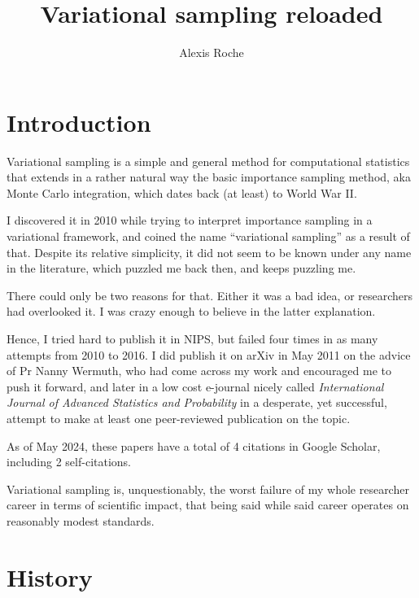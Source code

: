 \documentclass{article}
\title{Variational sampling reloaded}
\author{Alexis Roche}
\begin{document}
\maketitle


\section{Introduction}

Variational sampling is a simple and general method for computational statistics that extends in a rather natural way the basic importance sampling method, aka Monte Carlo integration, which dates back (at least) to World War II.

I discovered it in 2010 while trying to interpret importance sampling in a variational framework, and coined the name ``variational sampling'' as a result of that. Despite its relative simplicity, it did not seem to be known under any name in the literature, which puzzled me back then, and keeps puzzling me. 

There could only be two reasons for that. Either it was a bad idea, or researchers had overlooked it. I was crazy enough to believe in the latter explanation.

Hence, I tried hard to publish it in NIPS, but failed four times in as many attempts from 2010 to 2016. I did publish it on arXiv in May 2011 on the advice of Pr Nanny Wermuth, who had come across my work and encouraged me to push it forward, and later in a low cost e-journal nicely called {\em International Journal of Advanced Statistics and Probability} in a desperate, yet successful, attempt to make at least one peer-reviewed publication on the topic.

As of May 2024, these papers have a total of 4 citations in Google Scholar, including 2 self-citations. 

Variational sampling is, unquestionably, the worst failure of my whole researcher career in terms of scientific impact, that being said while said career operates on reasonably modest standards.



\section{History}
\end{document}
